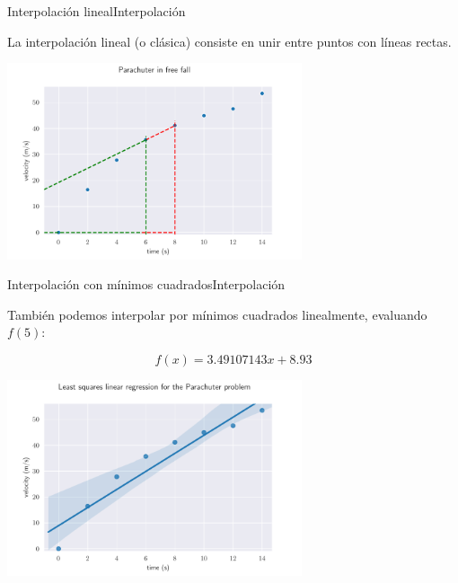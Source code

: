 \documentclass[spanish, c, dvipsnames]{beamer}
\begin{document}
\begin{frame}{Interpolación lineal}{Interpolación}

    La \alert{interpolación lineal} (o clásica) consiste en unir entre puntos con líneas rectas.

    \bigskip

    \begin{center}
        \includegraphics[width=0.65\textwidth]{inter01.pdf}
    \end{center}

\end{frame}

\begin{frame}{Interpolación con mínimos cuadrados}{Interpolación}

    También podemos \alert{interpolar por mínimos cuadrados} linealmente, evaluando $f(5)$:

    $$f(x) = 3.49107143 x + 8.93$$

    \begin{center}
        \includegraphics[width=0.65\textwidth]{inter02.pdf}
    \end{center}

\end{frame}
\end{document}
